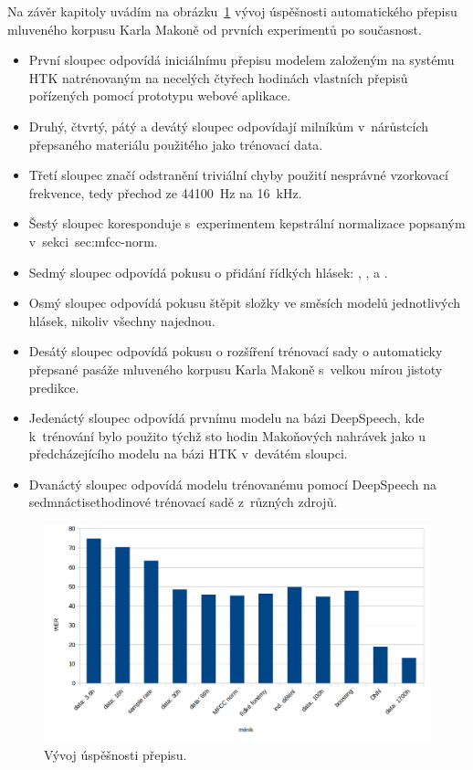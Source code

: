Na závěr kapitoly uvádím na obrázku~\ref{fig:asrhist} vývoj úspěšnosti
automatického přepisu mluveného korpusu Karla Makoně od prvních experimentů po
současnost.
\begin{itemize}
\item{
  První sloupec odpovídá iniciálnímu přepisu modelem založeným na
systému HTK natrénovaným na necelých čtyřech hodinách vlastních přepisů
pořízených pomocí prototypu webové aplikace.
}
\item{
  Druhý, čtvrtý, pátý a devátý sloupec odpovídají milníkům v~nárůstcích
  přepsaného materiálu použitého jako trénovací data.
}
\item{
  Třetí sloupec značí odstranění triviální chyby použití nesprávné
  vzorkovací frekvence, tedy přechod ze 44100~Hz na 16~kHz.
}
\item{
  Šestý sloupec koresponduje s~experimentem kepstrální normalizace popsaným
  v~sekci~{sec:mfcc-norm}.
}
\item{
  Sedmý sloupec odpovídá pokusu o přidání řídkých hlásek:
  , ,  a .
}
\item{
  Osmý sloupec odpovídá pokusu štěpit složky ve směsích modelů jednotlivých
  hlásek, nikoliv všechny najednou.
}
\item{
  Desátý sloupec odpovídá pokusu o rozšíření trénovací sady o automaticky
  přepsané pasáže mluveného korpusu Karla Makoně s~velkou mírou jistoty
  predikce.
}
\item{
  Jedenáctý sloupec odpovídá prvnímu modelu na bázi DeepSpeech, kde k~trénování
  bylo použito týchž sto hodin Makoňových nahrávek jako u předcházejícího modelu
  na bázi HTK v~devátém sloupci.
}
\item{
  Dvanáctý sloupec odpovídá modelu trénovanému pomocí DeepSpeech na
  sedmnáctisethodinové trénovací sadě z~různých zdrojů.
}
\end{itemize}

\begin{figure}[htpb]
\includegraphics[scale=1]{rc/asrhist.png}
\caption{
    Vývoj úspěšnosti přepisu.
}
\label{fig:asrhist}
\end{figure}
